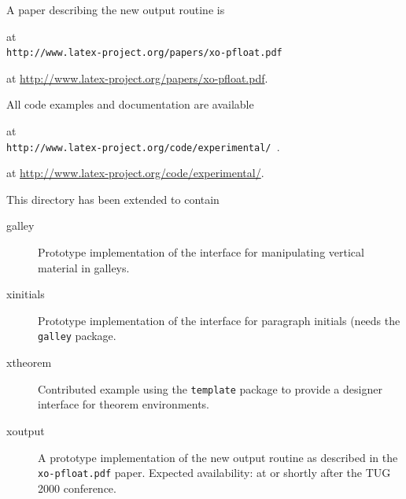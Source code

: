 \documentclass{ltnews}
\providecommand\pkg[1]{\texttt{#1}}
\providecommand\file[1]{\texttt{#1}}
\begin{document}
A paper describing the new output routine is
\begin{latexonly}
  at\\
  \file{http://www.latex-project.org/papers/xo-pfloat.pdf%
   \hspace*{-16pt}}\\
\end{latexonly}
\begin{htmlonly}
  at \url{http://www.latex-project.org/papers/xo-pfloat.pdf}.
\end{htmlonly}
All code examples and documentation are available
\begin{latexonly}
  at\\
   \file{http://www.latex-project.org/code/experimental/%
   \latex{\hspace*{-5pt}}}.\\[3pt]
\end{latexonly}
\begin{htmlonly}
  at \url{http://www.latex-project.org/code/experimental/}.

\end{htmlonly}
This directory has been extended to contain
\begin{description}
 \item[galley] Prototype implementation of the interface\latex{\\}
   for manipulating vertical material in galleys.
 \item[xinitials] Prototype implementation of the interface\latex{\\}
   for paragraph initials (needs the \pkg{galley} package.
 \item[xtheorem] Contributed example using the \pkg{template}
   package to provide a designer interface for theorem environments.
 \item[xoutput] A prototype implementation of the new output routine
   as described in the \file{xo-pfloat.pdf} paper. Expected
   availability: at or shortly after\latex{\\}
   the TUG\,2000 conference.
\end{description}
\end{document}
